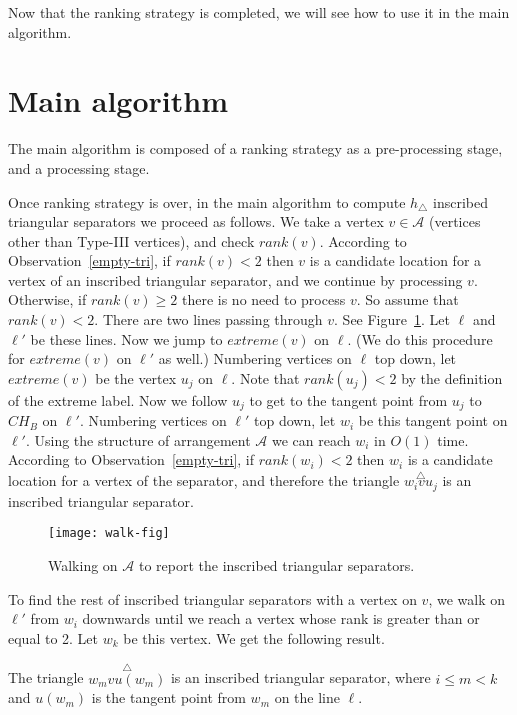 \documentclass[a4paper,UKenglish]{lipics-v2018}
\theoremstyle{definition}
\begin{document}
Now that the ranking strategy is completed, we will see how to use it in the main algorithm.

\section{Main algorithm}
The main algorithm is composed of a ranking strategy as a pre-processing stage, and a processing stage.

Once ranking strategy is over, in the main algorithm to compute $h_\triangle$ inscribed triangular separators we proceed as follows. We take a vertex $v \in \mathcal A$ (vertices other than Type-III vertices), and check $rank(v)$. According to Observation~\ref{empty-tri}, if $rank(v)<2$ then $v$ is a candidate location for a vertex of an inscribed triangular separator, and we continue by processing $v$. Otherwise, if $rank(v) \geq 2$ there is no need to process $v$. So assume that $rank(v)<2$. There are two lines passing through $v$. See Figure~\ref{walk-fig}. Let $\ell$ and $\ell'$ be these lines. Now we jump to $extreme(v)$ on $\ell$. (We do this procedure for $extreme(v)$ on $\ell'$ as well.) Numbering vertices on $\ell$ top down, let $extreme(v)$ be the vertex $u_j$ on $\ell$. Note that $rank(u_j)<2$ by the definition of the extreme label. Now we follow $u_j$ to get to the tangent point from $u_j$ to $CH_B$ on $\ell'$. Numbering vertices on $\ell'$ top down, let $w_i$ be this tangent point on $\ell'$. Using the structure of arrangement $\mathcal A$ we can reach $w_i$ in $O(1)$ time. According to Observation~\ref{empty-tri}, if $rank(w_i)<2$ then $w_i$ is a candidate location for a vertex of the separator, and therefore the triangle
$\overset{\triangle}{w_i v u_j}$ is an inscribed triangular separator.

\begin{figure}[h]
\centering
\texttt{[image: walk-fig]}
\caption{Walking on $\mathcal A$ to report the inscribed triangular separators.}
\label{walk-fig}
\end{figure}

To find the rest of inscribed triangular separators with a vertex on $v$, we walk on $\ell'$ from $w_i$ downwards until we reach a vertex whose rank is greater than or equal to 2. Let $w_k$ be this vertex. We get the following result.

\begin{lemma}
The triangle $\overset{\triangle}{w_m v u(w_m)}$ is an inscribed triangular separator, where $i \leq m < k$ and $u(w_m)$ is the tangent point from $w_m$ on the line $\ell$.
\end{lemma}
\end{document}
